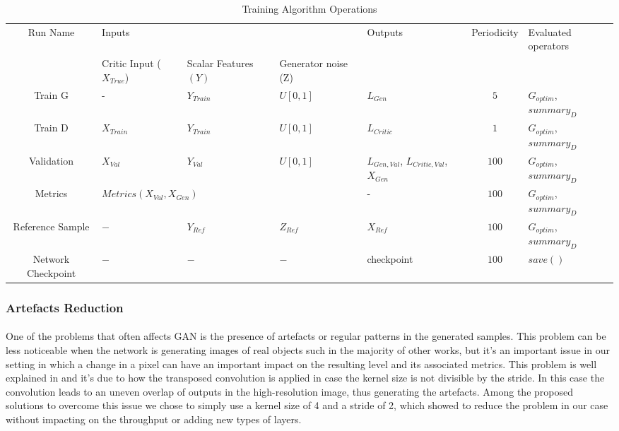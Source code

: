 \begin{table}[h!]
	\centering
	\begin{tabularx}{\textwidth}{| c | X | X | X | X | c | X | }
		\hline
		Run Name & \multicolumn{3}{X|}{Inputs} & Outputs & Periodicity & Evaluated operators \\ \cline{2-4}
		& Critic Input ($X_{True}$) & Scalar Features $(Y)$ & Generator noise (Z) &   &   &   \\
		\hline
		Train G & - & $Y_{Train}$ & $U[0,1]$ & $L_{Gen}$ & $5$ & $G_{optim}$, $summary_D$ \\ \hline
		Train D & $X_{Train}$ & $Y_{Train}$ & $U[0,1]$ & $L_{Critic}$ & $1$ & $G_{optim}$, $summary_D$\\ \hline
		Validation & $X_{Val}$ & $Y_{Val}$ & $U[0,1]$ &  $L_{Gen, Val}$, $L_{Critic, Val}$, $X_{Gen}$ & $100$ & $G_{optim}$, $summary_D$ \\ \hline
		Metrics & \multicolumn{3}{X|}{$Metrics(X_{Val}, X_{Gen})$} &  - & $100$ & $G_{optim}$, $summary_D$ \\ \hline
		Reference Sample & $-$ & $Y_{Ref}$ & $Z_{Ref}$ &  $X_{Ref}$ & $100$ & $G_{optim}$, $summary_D$ \\ \hline
		Network Checkpoint & $-$ & $-$ & $-$  & checkpoint & $100$ & $save()$ \\ \hline
	\end{tabularx}
	\caption{Training Algorithm Operations}
	\label{tab:training}
\end{table}


\subsubsection{Artefacts Reduction}
\label{sec:artefacts-reduction}
\paragraph{} One of the problems that often affects GAN is the presence of artefacts or regular patterns in the generated samples. This problem can be less noticeable when the network is generating images of real objects such in the majority of other works, but it's an important issue in our setting in which a change in a pixel can have an important impact on the resulting level and its associated metrics. This problem is well explained in \cite{artifacts} and it's due to how the transposed convolution is applied in case the kernel size is not divisible by the stride. In this case the convolution leads to an uneven overlap of outputs in the high-resolution image, thus generating the artefacts. Among the proposed solutions to overcome this issue we chose to simply use a kernel size of 4 and a stride of 2, which showed to reduce the problem in our case without impacting on the throughput or adding new types of layers. 

